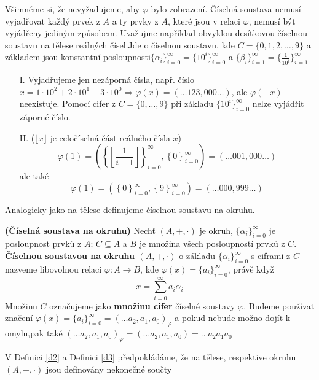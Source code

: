 \documentclass[czech,bachelor,dept470,male]{diploma}
\newcommand{\poslbeta}{\{\beta_i\}_{i=1}^{\infty}}
\newcommand{\poslalpha}{\{\alpha_i\}_{i=0}^{\infty}}
\begin{document}
Všimněme si, že nevyžadujeme, aby $\varphi$ bylo zobrazení. Číselná soustava nemusí vyjadřovat každý prvek z $A$ a ty prvky z $A$, které jsou v relaci $\varphi$, nemusí být vyjádřeny jediným způsobem. Uvažujme například obvyklou desítkovou číselnou soustavu na tělese reálných čísel.\newline Jde o číselnou soustavu, kde $C = \{0, 1, 2, \dots, 9\}$ a základem jsou konstantní posloupnosti\newline $\poslalpha = \{10^i\}_{i = 0}^{\infty}$ a $\poslbeta = \{\frac{1}{10^i}\}_{i = 1}^{\infty}$
\newpage
\begin{enumerate}
	\item[I.] Vyjadřujeme jen nezáporná čísla, např. číslo $x = 1\cdot10^2 + 2\cdot10^1 + 3\cdot10^0 \Rightarrow \varphi(x) = (\dots123,000\dots)$, ale $\varphi(-x)$ neexistuje. Pomocí cifer z $C=\{0,\dots,9\}$ při základu $\{10^i\}_{i=0}^{\infty}$ nelze vyjádřit záporné číslo.
	\item[II.] ($\lfloor x\rfloor$ je celočíselná část reálného čísla $x$)
	      $$\varphi(1) = \left( \left\{ \left\lfloor\frac{1}{i+1} \right\rfloor \right\}_{i = 0}^{\infty} , \left\{ 0 \right\}_{i = 0}^{\infty} \right) = \left(\dots 001,000 \dots \right)$$
	      ale také
	      $$\varphi(1) = \left( \left\{ 0 \right\}_{i = 0}^{\infty} , \left\{ 9 \right\}_{i = 0}^{\infty} \right) = \left(\dots 000,999 \dots \right)$$
\end{enumerate}
Analogicky jako na tělese definujeme číselnou soustavu na okruhu.
\begin{definition}\label{d3} \textbf{(Číselná soustava na okruhu)}
	Nechť $(A,+,\cdot)$ je okruh, $\poslalpha$ je posloupnost prvků z $A$; $C\subseteq A$ a $B$ je množina všech posloupností prvků z $C$.
	\newline\textbf{Číselnou soustavou na okruhu $(A,+,\cdot)$} o základu $\poslalpha$ s ciframi z $C$ nazveme libovolnou relaci $\varphi : A \rightarrow B$, kde $\varphi(x)= \{a_{i}\}_{i=0}^{\infty}$, právě když
	$$x = \sum_{i=0}^{\infty} a_{i}\alpha_{i}$$
	Množinu $C$ označujeme jako \textbf{množinu cifer} číselné soustavy $\varphi$. Budeme používat značení $\varphi(x) = \{a_{i}\}_{i=0}^{\infty} = (\dots a_2,a_1,a_0)_{\varphi}$ a pokud nebude možno dojít k omylu,\newline pak také $(\dots a_2,a_1,a_0)_{\varphi} = (\dots a_2,a_1,a_0) = \dots a_2a_1a_0$
\end{definition}
\begin{remark}
	V Definici \ref{d2} a Definici \ref{d3} předpokládáme, že na tělese, respektive okruhu $(A,+,\cdot)$ jsou definovány nekonečné součty
\end{remark}
\end{document}
